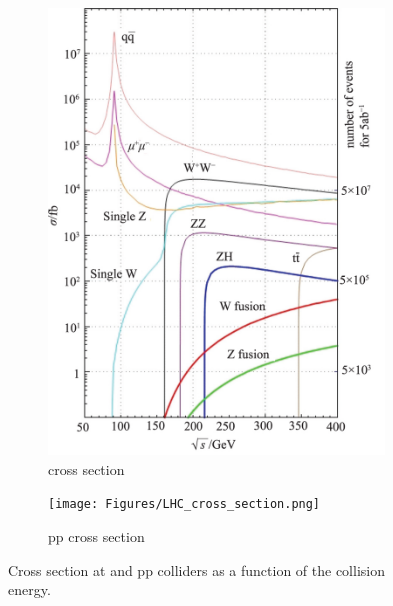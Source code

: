 \begin{figure}[h!]
\centering
\begin{subfigure}[b]{0.4\textwidth}
\includegraphics[width=0.98\textwidth]{Figures/ILC_cross_section.png}
\caption{\positron \electron cross section~\cite{ILC_cross}}
\end{subfigure}
\begin{subfigure}[b]{0.4\textwidth}
\texttt{[image: Figures/LHC\_cross\_section.png]}
\caption{pp cross section~\cite{LHC_cross}}
\end{subfigure}
\caption[Cross sections for ILC and LHC]{Cross section at \positron \electron and pp colliders as a function of the collision energy. }%
\label{fig:Cross_sections}
\end{figure}

